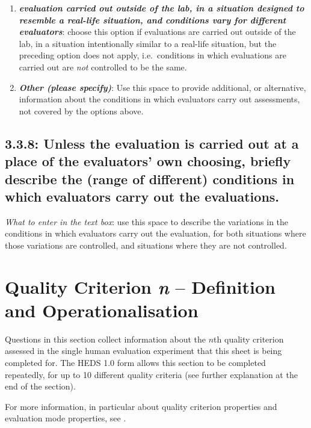 \documentclass[11pt,a4paper]{article}
\newcommand{\egcvalue}[1]{\textbf{\textit{#1}}}
\begin{document}
\begin{enumerate}[itemsep=0cm,leftmargin=0.5cm,label={\LARGE $\circ$}]
    \item \egcvalue{evaluation carried out outside of the lab, in a situation designed to resemble a real-life situation, and conditions vary for different evaluators}: choose this option if evaluations are carried out outside of the lab, in a situation intentionally similar to a real-life situation, but the preceding option does not apply, i.e.\ conditions in which evaluations are carried out are \textit{not} controlled to be the same. 
    \item \egcvalue{Other (please specify)}: Use this space to provide additional, or alternative, information about the conditions in which evaluators carry out assessments, not covered by the options above.
\end{enumerate}

\vspace{-.3cm}
\subsection*{3.3.8:  Unless the evaluation is carried out at a place of the evaluators'  own choosing, briefly describe the (range of different) conditions in which evaluators carry out the evaluations.}

\noindent\textit{What to enter in the text box}: use this space to describe the variations in the conditions in which evaluators carry out the evaluation, for both situations where those variations are controlled, and situations where they are not controlled.

\vspace{.3cm}

\section{Quality Criterion \textit{n} -- Definition and Operationalisation}
\label{sec:criteria}

Questions in this section collect information about the $n$th quality criterion assessed in the single human evaluation experiment that this sheet is being completed for. The HEDS 1.0 form allows this section to be completed repeatedly, for up to 10 different quality criteria (see further explanation at the end of the section).

For more information, in particular about quality criterion properties and evaluation mode properties, see \citet{belz-etal-2020-disentangling}.
\end{document}
